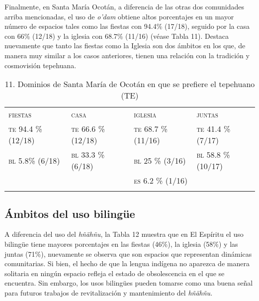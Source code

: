 \documentclass[output=paper]{../langscibook}
\begin{document}
Finalmente, en Santa María Ocotán, a diferencia de las otras dos comunidades arriba mencionadas, el uso de \textit{o'dam} obtiene altos porcentajes en un mayor número de espacios tales como las fiestas con 94.4\% (17/18), seguido por la casa con 66\% (12/18) y la iglesia con 68.7\% (11/16) (véase Tabla 11). Destaca nuevamente que tanto las fiestas como la Iglesia son dos ámbitos en los que, de manera muy similar a los casos anteriores, tienen una relación con la tradición y cosmovisión tepehuana.

\begin{table}
\caption{\label{tab:guerrero}11. Dominios de Santa María de Ocotán en que se prefiere el tepehuano (TE)}
\begin{tabularx}{\textwidth}{XXXX}
\lsptoprule
{\textsc{fiestas}} & {\textsc{casa}} & {\textsc{iglesia}} & {\textsc{juntas}}\\
{\textsc{te} \textsc{94.4} \textsc{\%} \textsc{(12/18)}} & {\textsc{te} \textsc{66.6} \textsc{\%} \textsc{(12/18)}} & {\textsc{te} \textsc{68.7} \textsc{\%} \textsc{(11/16)}} & {\textsc{te} \textsc{41.4} \textsc{\%} \textsc{(7/17)}}\\
{\textsc{bl} \textsc{5.8\%} \textsc{(6/18)}} & {\textsc{bl} \textsc{33.3} \textsc{\%} \textsc{(6/18)}} & {\textsc{bl} 25 \% (3/16)} & {\textsc{bl} \textsc{58.8} \textsc{\%} \textsc{(10/17)}}\\
&  & {\textsc{es} \textsc{6.2} \textsc{\%} \textsc{(1/16)}} & \\
\lspbottomrule
\end{tabularx}
\end{table}



 \subsection{Ámbitos del uso bilingüe}



A diferencia del uso del \textit{hñähñu}, la Tabla 12 muestra que en El Espíritu el uso bilingüe tiene mayores porcentajes en las fiestas (46\%), la iglesia (58\%) y las juntas (71\%), nuevamente se observa que son espacios que representan dinámicas comunitarias. Si bien, el hecho de que la lengua indígena no aparezca de manera solitaria en ningún espacio refleja el estado de obsolescencia en el que se encuentra. Sin embargo, los usos bilingües pueden tomarse como una buena señal para futuros trabajos de revitalización y mantenimiento del \textit{hñähñu.}
\end{document}

